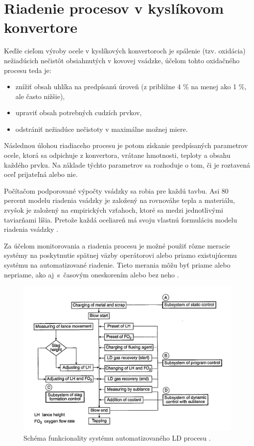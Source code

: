 \documentclass[]{tukediphc}
\begin{document}
\section{Riadenie procesov v kyslíkovom konvertore}

Keďže cieľom výroby ocele v kyslíkových konvertoroch je spálenie (tzv. oxidácia) nežiadúcich nečistôt obsiahnutých v kovovej vsádzke, účelom tohto oxidačného procesu teda je:

\begin{itemize}
	\item znížiť obsah uhlíka na predpísanú úroveň (z približne 4 \% na menej ako 1 \%, ale často nižšie),
	\item upraviť obsah potrebných cudzích prvkov,
	\item odstrániť nežiadúce nečistoty v maximálne možnej miere.
\end{itemize}

Následnou úlohou riadiaceho procesu je potom získanie predpísaných parametrov ocele, ktorá sa odpichuje z konvertora, vrátane hmotnosti, teploty a obsahu každého prvku. Na základe týchto parametrov sa rozhoduje o tom, či je roztavená oceľ prijateľná alebo nie.

Počítačom podporované výpočty vsádzky sa robia pre každú tavbu. Asi 80 percent modelu riadenia vsádzky je založený na rovnováhe tepla a materiálu, zvyšok je založený na empirických vzťahoch, ktoré sa medzi jednotlivými taviarňami líšia. Pretože každá oceliareň má svoju vlastnú formuláciu modelu riadenia vsádzky \citep{Turkdogan1996}.

Za účelom monitorovania a riadenia procesu je možné použiť rôzne meracie systémy na poskytnutie spätnej väzby operátorovi alebo priamo existujúcemu systému na automatizované riadenie. Tieto merania môžu byť priame alebo nepriame, ako aj~s~časovým oneskorením alebo bez neho \citep{Widlund1998}.

\begin{figure}[h!]
	\centering
	\includegraphics[width=.95\textwidth,angle=0]{figures/schematic-bof.jpg}
	\caption{Schéma funkcionality systému automatizovaného LD procesu \citep{Turkdogan1996}.}
\end{figure}
\end{document}

